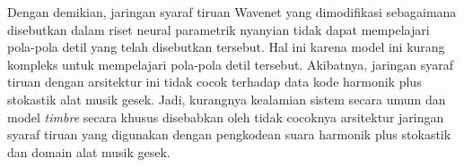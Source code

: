 Dengan demikian, jaringan syaraf tiruan Wavenet yang dimodifikasi sebagaimana disebutkan dalam riset neural parametrik nyanyian tidak dapat mempelajari pola-pola detil yang telah disebutkan tersebut. Hal ini karena model ini kurang kompleks untuk mempelajari pola-pola detil tersebut. Akibatnya, jaringan syaraf tiruan dengan arsitektur ini tidak cocok terhadap data kode harmonik plus stokastik alat musik gesek. Jadi, kurangnya kealamian sistem secara umum dan model \textit{timbre} secara khusus disebabkan oleh tidak cocoknya arsitektur jaringan syaraf tiruan yang digunakan dengan pengkodean suara harmonik plus stokastik dan domain alat musik gesek.
